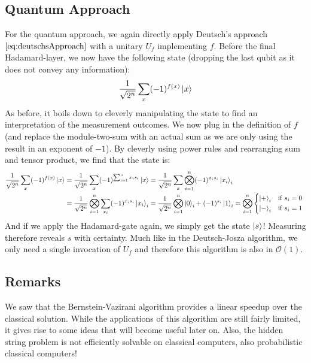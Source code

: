 		\subsection{Quantum Approach}
			For the quantum approach, we again directly apply Deutsch's approach \(\eqref{eq:deutschsApproach}\) with a unitary \(U_f\) implementing \(f\). Before the final Hadamard-layer, we now have the following state (dropping the last qubit as it does not convey any information):
			\begin{equation}
				\frac{1}{\sqrt{2^n}} \sum_x (-1)^{f(x)} \ket{x}  \label{eq:bernsteinVazirani1}
			\end{equation}
			As before, it boils down to cleverly manipulating the state to find an interpretation of the measurement outcomes. We now plug in the definition of \(f\) (and replace the module-two-sum with an actual sum as we are only using the result in an exponent of \(-1\)). By cleverly using power rules and rearranging sum and tensor product, we find that the state is:
			\begin{align}
				\frac{1}{\sqrt{2^n}} \sum_x (-1)^{f(x)} \ket{x}
					&= \frac{1}{\sqrt{2^n}} \sum_x (-1)^{\sum_{i = 1}^{n} x_i s_i} \ket{x}
					 = \frac{1}{\sqrt{2^n}} \sum_x \bigotimes_{i = 1}^{n} (-1)^{x_i s_i} \ket{x_i}_i \\
					&= \frac{1}{\sqrt{2^n}} \bigotimes_{i = 1}^{n} \sum_{x_i} (-1)^{x_i s_i} \ket{x_i}_i
					 = \frac{1}{\sqrt{2^n}} \bigotimes_{i = 1}^{n} \ket{0}_i + (-1)^{s_i} \ket{1}_i
					 = \bigotimes_{i = 1}^{n} \begin{cases*} \ket{+}_i & if \( s_i = 0 \) \\ \ket{-}_i & if \( s_i = 1 \) \end{cases*}
			\end{align}
			And if we apply the Hadamard-gate again, we simply get the state \(\ket{s}\)! Measuring therefore reveals \(s\) with certainty. Much like in the Deutsch-Josza algorithm, we only need a single invocation of \(U_f\) and therefore this algorithm is also in \(\mathcal{O}(1)\).

		\subsection{Remarks}
			We saw that the Bernstein-Vazirani algorithm provides a linear speedup over the classical solution. While the applications of this algorithm are still fairly limited, it gives rise to some ideas that will become useful later on. Also, the hidden string problem is not efficiently solvable on classical computers, also probabilistic classical computers!

